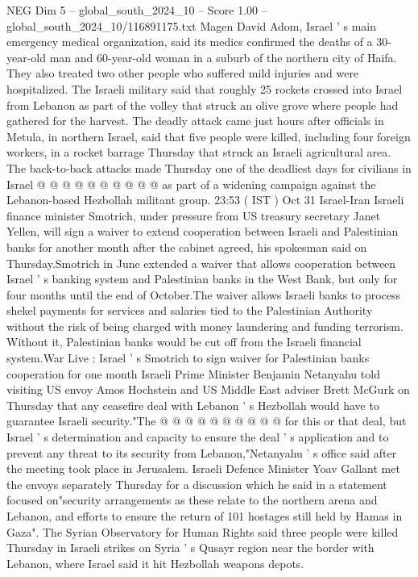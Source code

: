 \begin{textsample}{NEG Dim 5 – global\_south\_2024\_10 – Score 1.00 – global\_south\_2024\_10/116891175.txt}
Magen David Adom, Israel ' s main emergency medical organization, said its medics confirmed the deaths of a 30-year-old man and 60-year-old woman in a suburb of the northern city of Haifa.
They also treated two other people who suffered mild injuries and were hospitalized.
The Israeli military said that roughly 25 rockets crossed into Israel from Lebanon as part of the volley that struck an olive grove where people had gathered for the harvest.
The deadly attack came just hours after officials in Metula, in northern Israel, said that five people were killed, including four foreign workers, in a rocket barrage Thursday that struck an Israeli agricultural area.
The back-to-back attacks made Thursday one of the deadliest days for civilians in Israel @ @ @ @ @ @ @ @ @ @ as part of a widening campaign against the Lebanon-based Hezbollah militant group. 23:53 ( IST ) Oct 31 Israel-Iran Israeli finance minister Smotrich, under pressure from US treasury secretary Janet Yellen, will sign a waiver to extend cooperation between Israeli and Palestinian banks for another month after the cabinet agreed, his spokesman said on Thursday.Smotrich in June extended a waiver that allows cooperation between Israel ' s banking system and Palestinian banks in the West Bank, but only for four months until the end of October.The waiver allows Israeli banks to process shekel payments for services and salaries tied to the Palestinian Authority without the risk of being charged with money laundering and funding terrorism.
Without it, Palestinian banks would be cut off from the Israeli financial system.War Live : Israel ' s Smotrich to sign waiver for Palestinian banks cooperation for one month Israeli Prime Minister Benjamin Netanyahu told visiting US envoy Amos Hochstein and US Middle East adviser Brett McGurk on Thursday that any ceasefire deal with Lebanon ' s Hezbollah would have to guarantee Israeli security."The @ @ @ @ @ @ @ @ @ @ for this or that deal, but Israel ' s determination and capacity to ensure the deal ' s application and to prevent any threat to its security from Lebanon,"Netanyahu ' s office said after the meeting took place in Jerusalem.
Israeli Defence Minister Yoav Gallant met the envoys separately Thursday for a discussion which he said in a statement focused on"security arrangements as these relate to the northern arena and Lebanon, and efforts to ensure the return of 101 hostages still held by Hamas in Gaza".
The Syrian Observatory for Human Rights said three people were killed Thursday in Israeli strikes on Syria ' s Qusayr region near the border with Lebanon, where Israel said it hit Hezbollah weapons depots.

\end{textsample}
